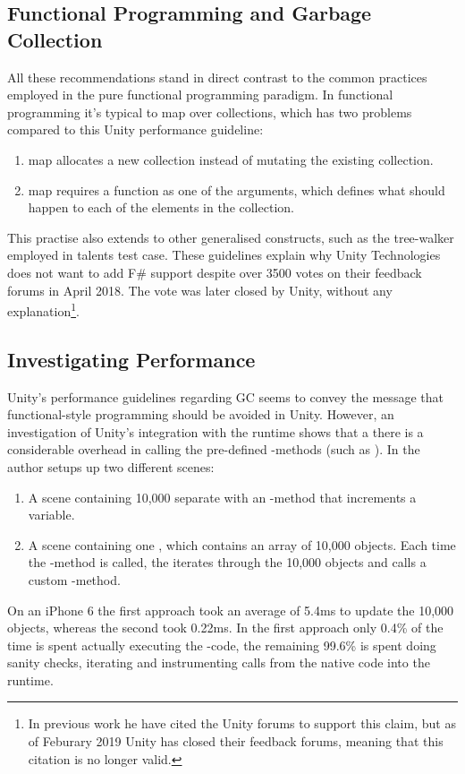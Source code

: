 \subsection{Functional Programming and Garbage Collection}
All these recommendations stand in direct contrast to the common practices employed in the pure functional programming paradigm. In functional programming it's typical to map over collections, which has two problems compared to this Unity performance guideline:
\begin{enumerate}
    \item map allocates a new collection instead of mutating the existing collection.
    \item map requires a function as one of the arguments, which defines what should happen to each of the elements in the collection.
\end{enumerate}
This practise also extends to other generalised constructs, such as the tree-walker employed in talents test case. These guidelines explain why Unity Technologies does not want to add F\# support despite over 3500 votes on their feedback forums in April 2018\cite{unity:fsharp}. The vote was later closed by Unity, without any explanation\footnote{In previous work \cite{p92018gameplay} he have cited the Unity forums to support this claim, but as of Feburary 2019 Unity has closed their feedback forums, meaning that this citation is no longer valid.}.

\subsection{Investigating Performance}
Unity's performance guidelines regarding \gls{GC} seems to convey the message that functional-style programming should be avoided in Unity. However, an investigation of Unity's integration with the runtime shows that a there is a considerable overhead in calling the pre-defined -methods (such as )\cite{unity:runtime:calls}. In \cite{unity:runtime:calls} the author setups up two different scenes:
\begin{enumerate}
    \item A scene containing 10,000 separate  with an -method that increments a variable.
    \item A scene containing one , which contains an array of 10,000 objects. Each time the -method is called, the  iterates through the 10,000 objects and calls a custom -method.
\end{enumerate}
On an iPhone 6 the first approach took an average of 5.4ms to update the 10,000 objects, whereas the second took 0.22ms\cite{unity:runtime:calls}. In the first approach only 0.4\% of the time is spent actually executing the -code, the remaining 99.6\% is spent doing sanity checks, iterating  and instrumenting calls from the native code into the runtime.

